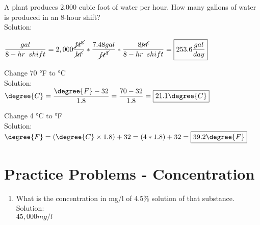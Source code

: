 \vspace{0.2cm}
\item A plant produces 2,000 cubic foot of water per hour. How many gallons of water is produced in an 8-hour shift?\\
Solution:\\
\vspace{0.2cm}

$\dfrac{gal}{8-hr \enspace shift}=2,000\dfrac{\cancel{ft^3}}{\cancel{hr}}*\dfrac{7.48gal}{\cancel{ft^3}}*\dfrac{8\cancel{hr}}{8-hr \enspace shift}=\boxed{253.6 \dfrac{gal}{day}}$

\vspace{0.2cm}
\item Change 70 °F to °C\\
Solution:\\
\vspace{0.2cm}
$\degree{C} = \dfrac{\degree{F}-32}{1.8} = \dfrac{70-32}{1.8}=\boxed{21.1\degree{C}}$
\vspace{0.2cm}
\item Change 4 °C to °F\\
Solution:\\
\vspace{0.2cm}
$\degree{F}=(\degree{C} \times 1.8)+32 = (4*1.8)+32=\boxed{39.2\degree{F}}$


\vspace{0.2cm}

\section*{Practice Problems - Concentration}
\begin{enumerate}
\item What is the concentration in mg/l of  4.5\% solution of that substance.\\
\vspace{0.2cm}
Solution:\\
\vspace{0.2cm}
$\boxed{45,000mg/l}$

\end{enumerate}

